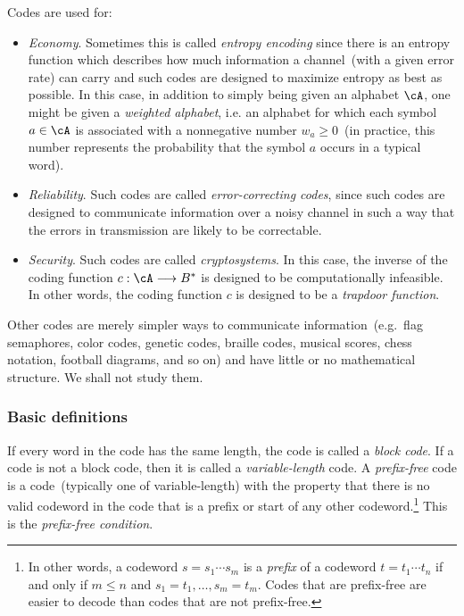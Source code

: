 Codes are used for:
\begin{itemize}
\item \emph{Economy}. Sometimes this is called
  \emph{entropy encoding} since there is an
  entropy function which describes how much
  information a channel~(with a given
  error rate) can carry and such codes are designed
  to maximize entropy as best as possible. In this case, in addition
  to simply being given an alphabet $\cA$, one might
  be given a \emph{weighted alphabet},
  i.e. an alphabet for which each symbol $a \in \cA$ is associated
  with a nonnegative number $w_a \geq 0$~(in practice, this number
  represents the probability that the symbol $a$ occurs in a typical
  word).

\item \emph{Reliability}. Such codes are
  called \emph{error-correcting codes},
  since such codes are designed to communicate information over a
  noisy channel in such a way that the errors in
  transmission are likely to be correctable.

\item \emph{Security}. Such codes are called
  \emph{cryptosystems}. In this case, the inverse
  of the coding function $c: \cA \to B^*$ is designed to be
  computationally infeasible. In other words, the
  coding function $c$ is designed to be a
  \emph{trapdoor function}.
\end{itemize}
Other codes are merely simpler ways to communicate
information~(e.g.~flag semaphores,
color codes, genetic codes,
braille codes, musical scores,
chess notation, football diagrams, and so
on) and have little or no mathematical structure. We shall not study
them.



\subsubsection{Basic definitions}

If every word in the code has the same length, the code is called a
\emph{block code}. If a code is not a block code,
then it is called a \emph{variable-length}
code. A \emph{prefix-free} code is a
code~(typically one of variable-length) with the property that there
is no valid codeword in the code that is a prefix or start of any
other codeword.\footnote{
  In other words, a codeword $s = s_1 \cdots s_m$ is a
  \emph{prefix} of a codeword $t = t_1 \cdots t_n$
  if and only if $m \leq n$ and $s_1 = t_1, \dots, s_m = t_m$. Codes
  that are prefix-free are easier to decode
  than codes that are not prefix-free.
}
This is the \emph{prefix-free condition}.

